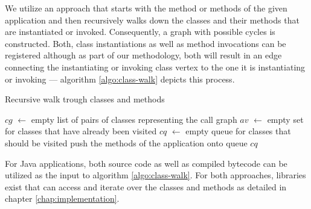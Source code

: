 \documentclass[12pt,a4paper]{report}
\begin{document}
We utilize an approach that starts with the  method or methods of
the given application and then recursively walks down the classes and their
methods that are instantiated or invoked. Consequently, a graph with
possible cycles is constructed.
Both, class instantiations as well as method invocations can be registered
although as part of our methodology, both  will result in an edge connecting
the instantiating or invoking class vertex to the one it is instantiating
or invoking --- algorithm \ref{algo:class-walk} depicts this process.

\begin{algorithm}[ht]
\caption{Recursive walk trough classes and methods}
\label{algo:class-walk}
  \BlankLine
  \BlankLine
  $cg$ $\leftarrow$ empty list of pairs of classes representing the call graph\;
  $av$ $\leftarrow$ empty set for classes that have already been visited\;
  $cq$ $\leftarrow$ empty queue for classes that should be visited\;
  \BlankLine
  push the  methods of the application onto queue $cq$\;
  \BlankLine
  \BlankLine
  \;
\end{algorithm}

For Java applications, both source code as well as compiled bytecode can
be utilized as the input to algorithm \ref{algo:class-walk}.
For both approaches, libraries exist that can access and iterate over
the classes and methods as detailed in chapter \ref{chap:implementation}.
\end{document}
